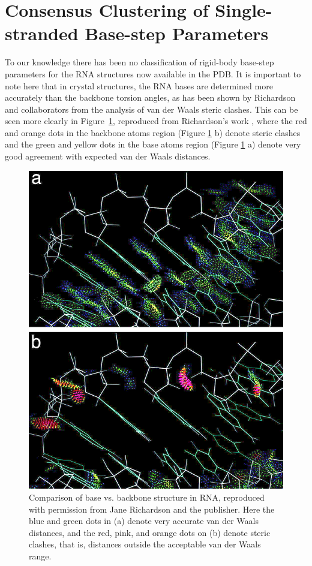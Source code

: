 \section{Consensus Clustering of Single-stranded Base-step Parameters}
To  our  knowledge there  has  been  no  classification of  rigid-body
base-step parameters for the RNA  structures now available in the PDB.
It is important to note here that in crystal structures, the RNA bases
are determined  more accurately than  the backbone torsion  angles, as
has been  shown by Richardson  and collaborators from the  analysis of
van  der Waals  steric  clashes.  This  can  be seen  more clearly  in
Figure~\ref{fig:murray},    reproduced    from    Richardson's    work
\cite{murray2003}, where the red and orange dots in the backbone atoms
region (Figure \ref{fig:murray} b) denote steric clashes and the green
and yellow dots in the base atoms region (Figure \ref{fig:murray} a)
denote very good agreement with expected van der Waals distances.
\begin{figure}[htbp]
 \centering
 \includegraphics[scale=0.4]{Chapter2/murray2003.png}
 \caption{Comparison   of  base  vs.    backbone  structure   in  RNA,
   reproduced with  permission from Jane  Richardson \cite{murray2003}
   and the publisher. Here the blue  and green dots in (a) denote very
   accurate van  der Waals  distances, and the  red, pink,  and orange
   dots on (b)  denote steric clashes, that is,  distances outside the
   acceptable van der Waals range.}
 \label{fig:murray}
\end{figure}

